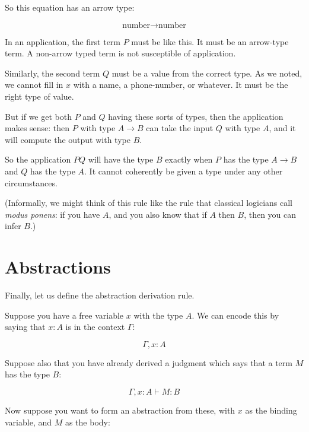 \documentclass{book}
\numberwithin{equation}{chapter}
\begin{document}
So this equation has an arrow type:

\begin{equation}
\text{number} \rightarrow \text{number}
\end{equation}

\noindent
In an application, the first term $P$ must be like this. It must be an arrow-type term. A non-arrow typed term is not susceptible of application.

Similarly, the second term $Q$ must be a value from the correct type. As we noted, we cannot fill in $x$ with a name, a phone-number, or whatever. It must be the right type of value.

But if we get both $P$ and $Q$ having these sorts of types, then the application makes sense: then $P$ with type $A \rightarrow B$ can take the input $Q$ with type $A$, and it will compute the output with type $B$. 

So the application $PQ$ will have the type $B$ exactly when $P$ has the type $A \rightarrow B$ and $Q$ has the type $A$. It cannot coherently be given a type under any other circumstances.

(Informally, we might think of this rule like the rule that classical logicians call \textit{modus ponens}: if you have $A$, and you also know that if $A$ then $B$, then you can infer $B$.)


\section{Abstractions}

Finally, let us define the abstraction derivation rule. 

Suppose you have a free variable $x$ with the type $A$. We can encode this by saying that $x : A$ is in the context $\Gamma$:

\begin{equation}
\Gamma, x : A
\end{equation}

\noindent
Suppose also that you have already derived a judgment which says that a term $M$ has the type $B$:

\begin{equation}
\Gamma, x : A \vdash M : B
\end{equation}

\noindent
Now suppose you want to form an abstraction from these, with $x$ as the binding variable, and $M$ as the body:
\end{document}
